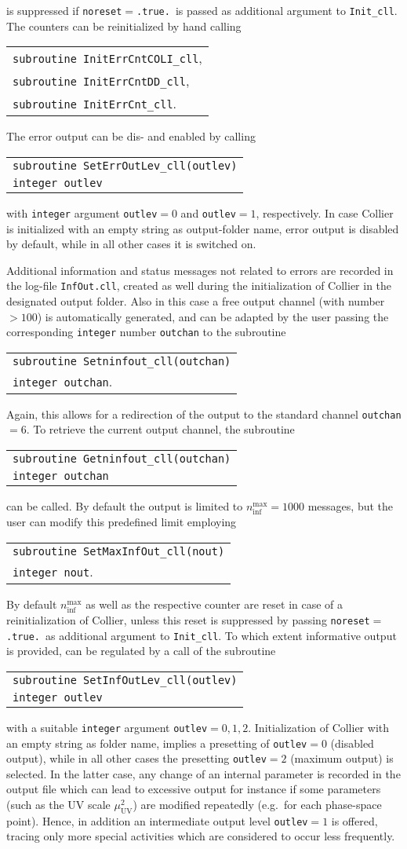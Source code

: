 \documentclass[preprint,sort&compress,12pt]{elsarticle}
\makeatletter
\def\bce{\begin{center}}
\def\ece{\end{center}}
\def\eg{e.g.\ }
\newcommand{\UV}{{\mathrm{UV}}}
\newcommand{\collier}{{\sc Collier}}
\newlength{\parwidth}\newlength{\colonewidth}%
\newcommand{\cpcsub}[1]
{%
\setlength{\parwidth}{\textwidth}\addtolength{\parwidth}{-2.1em}%
\bce
\begin{tabular}[t]{@{}p{\parwidth}@{}}
#1
\end{tabular}
\ece
}%
\makeatother
\begin{document}
is suppressed if {\tt noreset$=$.true.}\ is passed as 
additional argument to {\tt Init\_cll}. The counters can be
reinitialized by hand calling 
\cpcsub{
{\tt subroutine  InitErrCntCOLI\_cll}\;,\\
{\tt subroutine  InitErrCntDD\_cll}\;,\\
{\tt subroutine  InitErrCnt\_cll}\;.
}
The error output can be dis- and enabled by calling
\cpcsub{
{\tt subroutine  SetErrOutLev\_cll(outlev)}\\
{\tt integer outlev} \\
}
with {\tt integer} argument {\tt outlev${=}0$} and {\tt outlev${=}1$}, respectively. In case {\collier} is initialized with an empty string 
as output-folder name, error output is disabled by default, while in all other cases it is switched on.

Additional information and status messages not related to errors are
recorded in the log-file 
{\tt InfOut.cll}, created as well during the 
initialization of {\collier} in the designated output folder. Also in this case a free output channel (with number $>100$) is automatically 
generated, and can be adapted by the user passing the corresponding {\tt integer} number {\tt outchan} to the subroutine
\cpcsub{
{\tt subroutine  Setninfout\_cll(outchan)}\\
{\tt integer outchan}\;. \\
}
Again, this allows for a redirection of the output to the standard channel {\tt outchan${=}6$}. 
To retrieve the current output channel, the subroutine
\cpcsub{
{\tt subroutine  Getninfout\_cll(outchan)}\\
{\tt integer outchan} \\
}
can be called. By default the output is limited to $n_{\textrm{inf}}^{\textrm{max}}=1000$ messages,
but the user can modify this predefined limit employing
\cpcsub{
{\tt subroutine  SetMaxInfOut\_cll(nout)}\\
{\tt integer nout}\;. \\
} 
By default $n_{\textrm{inf}}^{\textrm{max}}$
as well as the respective counter
are reset in case of a reinitialization of {\collier}, unless this reset
is suppressed by passing  {\tt noreset$=$.true.}\ as 
additional argument to {\tt Init\_cll}.
To which extent informative output is provided, can be regulated by a
call of the subroutine
\cpcsub{
{\tt subroutine  SetInfOutLev\_cll(outlev)} \\
{\tt integer outlev} \\
}
with a suitable {\tt integer} argument {\tt outlev${=}0,1,2$}.
Initialization of {\collier} with an empty string as folder name,
implies a presetting of {\tt outlev${=}0$} (disabled output), while in
all other cases the presetting {\tt outlev${=}2$} (maximum output) is
selected. In the latter case, any change of an internal parameter is
recorded in the output file which can lead to excessive output for
instance if some parameters (such as the UV scale $\mu_\UV^2$) are
modified repeatedly (\eg for each phase-space point). Hence, in
addition an intermediate output level {\tt outlev${=}1$} is offered,
tracing only more special activities which are considered to occur
less frequently.
\end{document}
